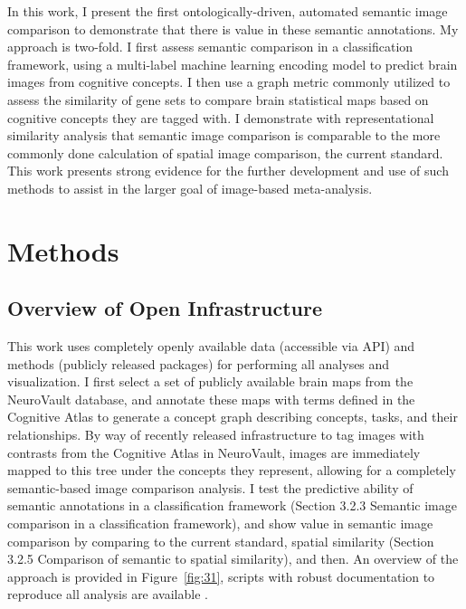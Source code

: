 \documentclass{report}
\begin{document}
In this work, I present the first ontologically-driven, automated
semantic image comparison to demonstrate that there is value in these
semantic annotations. My approach is two-fold. I first assess semantic
comparison in a classification framework, using a multi-label machine
learning encoding model to predict brain images from cognitive concepts.
I then use a graph metric commonly utilized to assess the similarity of
gene sets to compare brain statistical maps based on cognitive concepts
they are tagged with. I demonstrate with representational similarity
analysis that semantic image comparison is comparable to the more
commonly done calculation of spatial image comparison, the current
standard. This work presents strong evidence for the further development
and use of such methods to assist in the larger goal of image-based
meta-analysis.

\section{Methods}

\subsection{Overview of Open Infrastructure}

This work uses completely openly available data (accessible via API) and
methods (publicly released packages) for performing all analyses and
visualization. I first select a set of publicly available brain maps
from the NeuroVault database, and annotate
these maps with terms defined in the Cognitive Atlas to generate a
concept graph describing concepts, tasks, and their relationships. By way of recently released
infrastructure to tag images with contrasts from the Cognitive Atlas in
NeuroVault, images are immediately mapped to this tree under the
concepts they represent, allowing for a completely semantic-based image
comparison analysis. I test the predictive ability of semantic
annotations in a classification framework (Section 3.2.3 Semantic image
comparison in a classification framework), and show value in semantic
image comparison by comparing to the current standard, spatial
similarity (Section 3.2.5 Comparison of semantic to spatial similarity),
and then. An overview of the approach is provided in Figure~\ref{fig:31}, scripts
with robust documentation to reproduce all analysis are available \cite{Vsoch_undated-mq}.
\end{document}
